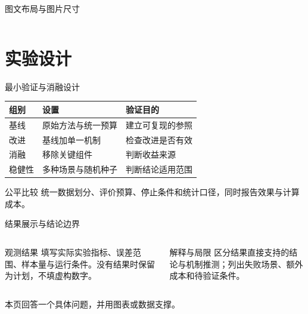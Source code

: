 \documentclass[aspectratio=169,11pt]{beamer}
\begin{document}
\begin{frame}[t]{图文布局与图片尺寸}
\begin{columns}[T,onlytextwidth]
\begin{column}{.58\textwidth}
\centering
{}
\end{column}
\begin{column}{.38\textwidth}
\end{column}
\end{columns}
\end{frame}

\section{实验设计}
\begin{frame}[t]{最小验证与消融设计}
\begin{tabularx}{\textwidth}{lYY}
\toprule 组别 & 设置 & 验证目的 \\
\midrule
基线 & 原始方法与统一预算 & 建立可复现的参照 \\
改进 & 基线加单一机制 & 检查改进是否有效 \\
消融 & 移除关键组件 & 判断收益来源 \\
稳健性 & 多种场景与随机种子 & 判断结论适用范围 \\
\bottomrule
\end{tabularx}
\vspace{.3cm}
\begin{alertblock}{公平比较}
统一数据划分、评价预算、停止条件和统计口径，同时报告效果与计算成本。
\end{alertblock}
\end{frame}

\begin{frame}[t]{结果展示与结论边界}
\begin{columns}[T,onlytextwidth]
\begin{column}{.48\textwidth}
\begin{block}{观测结果}
填写实际实验指标、误差范围、样本量与运行条件。没有结果时保留为计划，不填虚构数字。
\end{block}
\end{column}
\begin{column}{.48\textwidth}
\begin{exampleblock}{解释与局限}
区分结果直接支持的结论与机制推测；列出失败场景、额外成本和待验证条件。
\end{exampleblock}
\end{column}
\end{columns}
\contentdivider
{}
本页回答一个具体问题，并用图表或数据支撑。
\end{frame}
\end{document}
